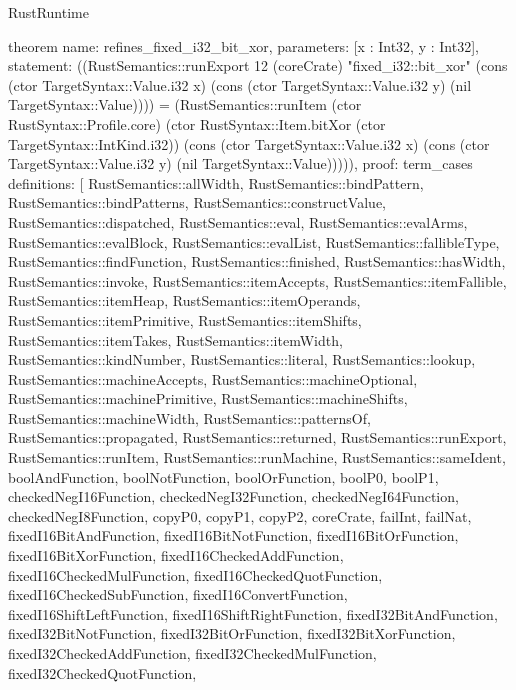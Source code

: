 \begin{lexlean}{RustRuntime}
\begin{semanticmodule}
theorem{
  name: refines_fixed_i32_bit_xor,
  parameters: [x : Int32, y : Int32],
  statement: ((RustSemantics::runExport 12 (coreCrate) "fixed_i32::bit_xor" (cons (ctor TargetSyntax::Value.i32 x) (cons (ctor TargetSyntax::Value.i32 y) (nil TargetSyntax::Value)))) = (RustSemantics::runItem (ctor RustSyntax::Profile.core) (ctor RustSyntax::Item.bitXor (ctor TargetSyntax::IntKind.i32)) (cons (ctor TargetSyntax::Value.i32 x) (cons (ctor TargetSyntax::Value.i32 y) (nil TargetSyntax::Value))))),
  proof: term_cases{
    definitions: [
      RustSemantics::allWidth,
      RustSemantics::bindPattern,
      RustSemantics::bindPatterns,
      RustSemantics::constructValue,
      RustSemantics::dispatched,
      RustSemantics::eval,
      RustSemantics::evalArms,
      RustSemantics::evalBlock,
      RustSemantics::evalList,
      RustSemantics::fallibleType,
      RustSemantics::findFunction,
      RustSemantics::finished,
      RustSemantics::hasWidth,
      RustSemantics::invoke,
      RustSemantics::itemAccepts,
      RustSemantics::itemFallible,
      RustSemantics::itemHeap,
      RustSemantics::itemOperands,
      RustSemantics::itemPrimitive,
      RustSemantics::itemShifts,
      RustSemantics::itemTakes,
      RustSemantics::itemWidth,
      RustSemantics::kindNumber,
      RustSemantics::literal,
      RustSemantics::lookup,
      RustSemantics::machineAccepts,
      RustSemantics::machineOptional,
      RustSemantics::machinePrimitive,
      RustSemantics::machineShifts,
      RustSemantics::machineWidth,
      RustSemantics::patternsOf,
      RustSemantics::propagated,
      RustSemantics::returned,
      RustSemantics::runExport,
      RustSemantics::runItem,
      RustSemantics::runMachine,
      RustSemantics::sameIdent,
      boolAndFunction,
      boolNotFunction,
      boolOrFunction,
      boolP0,
      boolP1,
      checkedNegI16Function,
      checkedNegI32Function,
      checkedNegI64Function,
      checkedNegI8Function,
      copyP0,
      copyP1,
      copyP2,
      coreCrate,
      failInt,
      failNat,
      fixedI16BitAndFunction,
      fixedI16BitNotFunction,
      fixedI16BitOrFunction,
      fixedI16BitXorFunction,
      fixedI16CheckedAddFunction,
      fixedI16CheckedMulFunction,
      fixedI16CheckedQuotFunction,
      fixedI16CheckedSubFunction,
      fixedI16ConvertFunction,
      fixedI16ShiftLeftFunction,
      fixedI16ShiftRightFunction,
      fixedI32BitAndFunction,
      fixedI32BitNotFunction,
      fixedI32BitOrFunction,
      fixedI32BitXorFunction,
      fixedI32CheckedAddFunction,
      fixedI32CheckedMulFunction,
      fixedI32CheckedQuotFunction,
}}
\end{semanticmodule}
\end{lexlean}

